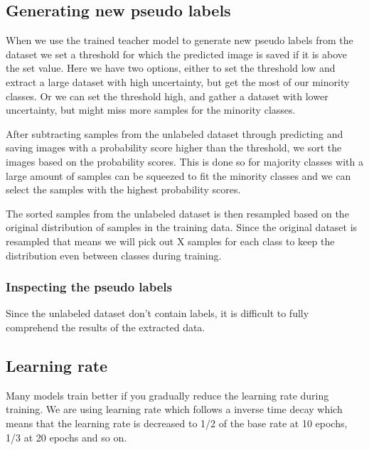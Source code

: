 \documentclass[thesis.tex]{subfiles}
\begin{document}
\subsection{Generating new pseudo labels}
When we use the trained teacher model to generate new pseudo labels from the dataset we set a threshold for which the predicted image is saved if it is above the set value. Here we have two options, either to set the threshold low and extract a large dataset with high uncertainty, but get the most of our minority classes. Or we can set the threshold high, and gather a dataset with lower uncertainty, but might miss more samples for the minority classes.

After subtracting samples from the unlabeled dataset through predicting and saving images with a probability score higher than the threshold, we sort the images based on the probability scores. This is done so for majority classes with a large amount of samples can be squeezed to fit the minority classes and we can select the samples with the highest probability scores.

The sorted samples from the unlabeled dataset is then resampled based on the original distribution of samples in the training data. Since the original dataset is resampled that means we will pick out X samples for each class to keep the distribution even between classes during training.

\subsubsection{Inspecting the pseudo labels}
Since the unlabeled dataset don't contain labels, it is difficult to fully comprehend the results of the extracted data.



\subsection{Learning rate}
Many models train better if you gradually reduce the learning rate during training. We are using learning rate which follows a inverse time decay which means that the learning rate is decreased to 1/2 of the base rate at 10 epochs, 1/3 at 20 epochs and so on.

\end{document}
